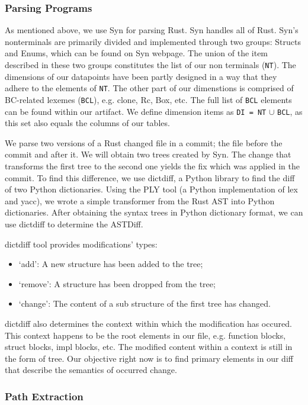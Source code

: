 \subsubsection{\label{sec:parsing_programs}Parsing Programs}

As mentioned above, we use Syn for parsing Rust. Syn handles all of Rust. Syn's nonterminals are primarily divided and implemented through two groups: Structs and Enums, which can be found on Syn webpage. The union of the item described in these two groups constitutes the list of our non terminals (\verb+NT+). The dimensions of our datapoints have been partly designed in a way that they adhere to the elements of \verb+NT+. The other part of our dimenstions is comprised of BC-related lexemes (\verb+BCL+), e.g. clone, Rc, Box, etc. The full list of \verb+BCL+ elements can be found within our artifact. We define dimension items as \verb+DI = NT+ $\cup$ \verb+BCL+, as this set also equals the columns of our tables.

We parse two versions of a Rust changed file in a commit; the file before the commit and after it. We will obtain two trees created by Syn. The change that transforms the first tree to the second one yields the fix which was applied in the commit. To find this difference, we use dictdiff, a Python library to find the diff of two Python dictionaries. Using the PLY tool (a Python implementation of lex and yacc), we wrote a simple transformer from the Rust AST into Python dictionaries. After obtaining the syntax trees in Python dictionary format, we can use dictdiff to determine the ASTDiff. 

dictdiff tool provides modifications' types: 
\begin{itemize}
\item `add': A new structure has been added to the tree; 
\item `remove': A structure has been dropped from the tree; 
\item `change': The content of a sub structure of the first tree has changed.
\end{itemize}
dictdiff also determines the context within which the modification has occured. This context happens to be the root elements in our file, e.g. function blocks, struct blocks, impl blocks, etc. The modified content within a context is still in the form of tree. Our objective right now is to find primary elements in our diff that describe the semantics of occurred change.

\subsubsection{\label{sec:path_extraction}Path Extraction}

